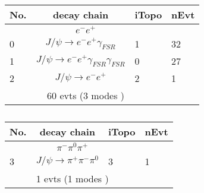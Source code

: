 \begin{table}[htbp] 
\begin{center}
\begin{small}
\begin{tabular}{lcll}\hline\hline
No. & decay chain &   iTopo & nEvt \\\hline
\multicolumn{3}{c}{$e^{-}        e^{+}        $}\\\hline 
  0&$J/\psi       \rightarrow e^{-}        e^{+}        \gamma_{FSR} $&    1&   32\\
  1&$J/\psi       \rightarrow e^{-}        e^{+}        \gamma_{FSR} \gamma_{FSR} $&    0&   27\\
  2&$J/\psi       \rightarrow e^{-}        e^{+}        $&    2&    1\\
\hline\multicolumn{3}{c}{60 evts (3 modes )}\\\hline 
\hline\hline
\end{tabular}
\end{small}
\caption{ }
\end{center}
\end{table}

\clearpage
\begin{table}[htbp] 
\begin{center}
\begin{small}
\begin{tabular}{lcll}\hline\hline
No. & decay chain &   iTopo & nEvt \\\hline
\multicolumn{3}{c}{$\pi^{-}        \pi^{0}        \pi^{+}        $}\\\hline 
  3&$J/\psi       \rightarrow \pi^{+}        \pi^{-}        \pi^{0}        $&    3&    1\\
\hline\multicolumn{3}{c}{1 evts (1 modes )}\\\hline 
\hline\hline
\end{tabular}
\end{small}
\caption{ }
\end{center}
\end{table}

\clearpage
